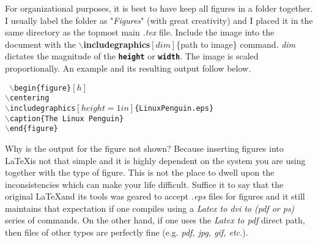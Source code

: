  For organizational purposes, it is best to have keep all figures in a folder together. I usually label the folder as "\textit{Figures}" (with great creativity) and I placed it in the same directory as the topmost main \textit{.tex} file.  Include the image into the document
 with the \textbf{$\backslash$includegraphics}$[\textit{dim}]$\{path to image\} command.  \textit{dim} dictates the magnitude of the \texttt{\textbf{height}} or \texttt{\textbf{width}}.  The image is scaled proportionally.  An example and its resulting output follow below.
 \\    \vspace{-2mm}
 \begin{center}
 \texttt{
 $\backslash$begin\{figure\}$[h]$\\
    \hspace{.25in} $\backslash$centering\\
    \hspace{.25in} $\backslash$includegraphics$[height=1in]$\{LinuxPenguin.eps\}\\
    \hspace{.25in} $\backslash$caption\{The Linux Penguin\}\\
 $\backslash$end\{figure\}
 }
 \end{center}



Why is the output for the figure not shown? Because inserting figures into \LaTeX is not that simple and it is highly dependent on the system you are using together with the type of figure. This is not the place to dwell upon the inconsistencies which can make your life difficult. Suffice it to say that the original \LaTeX and its tools was geared to accept \textit{.eps} files for figures and it still maintains that expectation if one compiles using a \textit{Latex to dvi to (pdf or ps)} series of commands. On the other hand, if one uses the \textit{Latex to pdf} direct path, then files of other types are perfectly fine (e.g. \textit{pdf, jpg, gif, etc.}).

